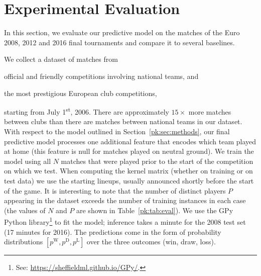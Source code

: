 \section{Experimental Evaluation}
\label{pk:sec:evaluation}

In this section, we evaluate our predictive model on the matches of the Euro 2008, 2012 and 2016 final tournaments and compare it to several baselines.

We collect a dataset of matches from
\begin{enuminline}
\item official and friendly competitions involving national teams, and
\item the most prestigious European club competitions,
\end{enuminline}
starting from July 1\textsuperscript{st}, 2006.
There are approximately $15 \times$ more matches between clubs than there are matches between national teams in our dataset.
With respect to the model outlined in Section~\ref{pk:sec:methods}, our final predictive model processes one additional feature that encodes which team played at home (this feature is null for matches played on neutral ground).
We train the model using all $N$ matches that were played prior to the start of the competition on which we test.
When computing the kernel matrix (whether on training or on test data) we use the starting lineups, usually announced shortly before the start of the game.
It is interesting to note that the number of distinct players $P$ appearing in the dataset exceeds the number of training instances in each case (the values of $N$ and $P$ are shown in Table~\ref{pk:tab:eval}).
We use the GPy Python library\footnote{See: \url{https://sheffieldml.github.io/GPy/}.} to fit the model; inference takes a minute for the 2008 test set (17 minutes for 2016).
The predictions come in the form of probability distributions $[p^{\text{W}}, p^{\text{D}}, p^{\text{L}}]$ over the three outcomes (win, draw, loss).

